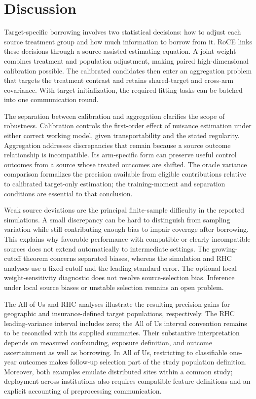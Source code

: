 \documentclass[12pt]{article}
\begin{document}
\section{Discussion}\label{sec:discussion}

Target-specific borrowing involves two statistical decisions: how to adjust each source treatment group and how much information to borrow from it. RoCE links these decisions through a source-assisted estimating equation. A joint weight combines treatment and population adjustment, making paired high-dimensional calibration possible. The calibrated candidates then enter an aggregation problem that targets the treatment contrast and retains shared-target and cross-arm covariance. With target initialization, the required fitting tasks can be batched into one communication round.

The separation between calibration and aggregation clarifies the scope of robustness. Calibration controls the first-order effect of nuisance estimation under either correct working model, given transportability and the stated regularity. Aggregation addresses discrepancies that remain because a source outcome relationship is incompatible. Its arm-specific form can preserve useful control outcomes from a source whose treated outcomes are shifted. The oracle variance comparison formalizes the precision available from eligible contributions relative to calibrated target-only estimation; the training-moment and separation conditions are essential to that conclusion.

Weak source deviations are the principal finite-sample difficulty in the reported simulations. A small discrepancy can be hard to distinguish from sampling variation while still contributing enough bias to impair coverage after borrowing. This explains why favorable performance with compatible or clearly incompatible sources does not extend automatically to intermediate settings. The growing-cutoff theorem concerns separated biases, whereas the simulation and RHC analyses use a fixed cutoff and the leading standard error. The optional local weight-sensitivity diagnostic does not resolve source-selection bias. Inference under local source biases or unstable selection remains an open problem.

The All of Us and RHC analyses illustrate the resulting precision gains for geographic and insurance-defined target populations, respectively. The RHC leading-variance interval includes zero; the All of Us interval convention remains to be reconciled with its supplied summaries. Their substantive interpretation depends on measured confounding, exposure definition, and outcome ascertainment as well as borrowing. In All of Us, restricting to classifiable one-year outcomes makes follow-up selection part of the study population definition. Moreover, both examples emulate distributed sites within a common study; deployment across institutions also requires compatible feature definitions and an explicit accounting of preprocessing communication.
\end{document}
